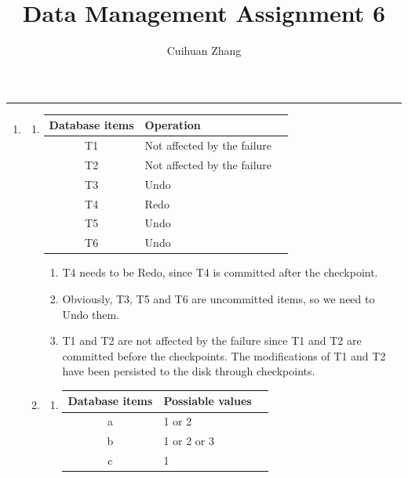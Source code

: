 \documentclass[12pt]{extarticle}
\title{Data Management Assignment 6}
\author{Cuihuan Zhang}
\begin{document}
\maketitle \vspace{-10mm}
\rule{\linewidth}{0.4pt}

\begin{flushleft}
\begin{enumerate}

\item

\begin{enumerate}

\item \begin{tabular}{cll}
\toprule
\textbf{Database items} & \textbf{Operation} \\
\midrule
T1     & Not affected by the failure   \\
T2     & Not affected by the failure    \\
T3     & Undo    \\
T4     & Redo   \\
T5     & Undo   \\
T6     & Undo   \\
\bottomrule
\end{tabular}

\begin{enumerate}

\item T4 needs to be Redo, since T4 is committed after the checkpoint.
\item Obviously, T3, T5 and T6 are uncommitted items, so we need to Undo them.
\item T1 and T2 are not affected by the failure since T1 and T2 are committed before the checkpoints. The modifications of T1 and T2 have been persisted to the disk through checkpoints.
\end{enumerate}

\item

\begin{enumerate}
\item
\begin{tabular}{cll}
\toprule
\textbf{Database items} & \textbf{Possiable values} \\
\midrule
a     & 1 or 2   \\
b     & 1 or 2 or 3    \\
c     & 1    \\
\bottomrule
\end{tabular}


\end{enumerate}
\end{enumerate}
\end{enumerate}
\end{flushleft}
\end{document}
